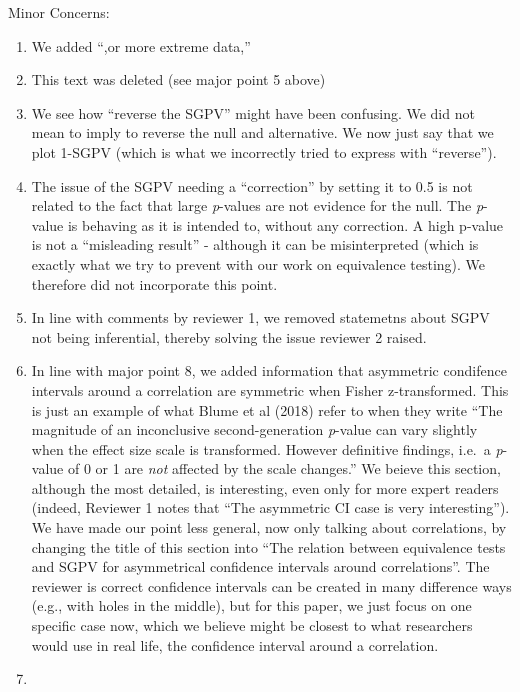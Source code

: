 \documentclass[man]{apa6}
\begin{document}
Minor Concerns:

\begin{enumerate}
\def\labelenumi{\arabic{enumi}.}
\item
  We added \enquote{,or more extreme data,}
\item
  This text was deleted (see major point 5 above)
\item
  We see how \enquote{reverse the SGPV} might have been confusing. We did not mean to imply to reverse the null and alternative. We now just say that we plot 1-SGPV (which is what we incorrectly tried to express with \enquote{reverse}).
\item
  The issue of the SGPV needing a \enquote{correction} by setting it to 0.5 is not related to the fact that large \emph{p}-values are not evidence for the null. The \emph{p}-value is behaving as it is intended to, without any correction. A high p-value is not a \enquote{misleading result} - although it can be misinterpreted (which is exactly what we try to prevent with our work on equivalence testing). We therefore did not incorporate this point.
\item
  In line with comments by reviewer 1, we removed statemetns about SGPV not being inferential, thereby solving the issue reviewer 2 raised.
\item
  In line with major point 8, we added information that asymmetric condifence intervals around a correlation are symmetric when Fisher z-transformed. This is just an example of what Blume et al (2018) refer to when they write \enquote{The magnitude of an inconclusive second-generation \emph{p}-value can vary slightly when the effect size scale is transformed. However definitive findings, i.e.~a \emph{p}-value of 0 or 1 are \emph{not} affected by the scale changes.} We beieve this section, although the most detailed, is interesting, even only for more expert readers (indeed, Reviewer 1 notes that \enquote{The asymmetric CI case is very interesting}). We have made our point less general, now only talking about correlations, by changing the title of this section into \enquote{The relation between equivalence tests and SGPV for asymmetrical confidence intervals around correlations}. The reviewer is correct confidence intervals can be created in many difference ways (e.g., with holes in the middle), but for this paper, we just focus on one specific case now, which we believe might be closest to what researchers would use in real life, the confidence interval around a correlation.
\item

\end{enumerate}
\end{document}
